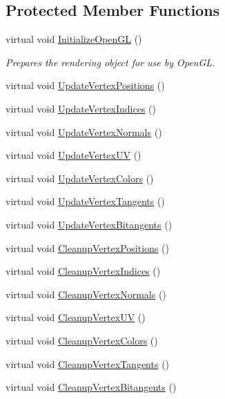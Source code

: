 \subsection*{Protected Member Functions}
\begin{DoxyCompactItemize}
\item
virtual void \hyperlink{class_rendering_object_a77c78d1b42ea2ebfdbf994b6b91ce805}{Initialize\+Open\+GL} ()
\begin{DoxyCompactList}\small\item\em Prepares the rendering object for use by Open\+GL. \end{DoxyCompactList}\item
virtual void \hyperlink{class_rendering_object_a7a097727acf37f9671ddd5e3a9873771}{Update\+Vertex\+Positions} ()
\item
virtual void \hyperlink{class_rendering_object_afb49054121b1b552bce58625db91b851}{Update\+Vertex\+Indices} ()
\item
virtual void \hyperlink{class_rendering_object_ae4b537e1c9b1c5c50cb7b0db83e6f190}{Update\+Vertex\+Normals} ()
\item
virtual void \hyperlink{class_rendering_object_ac00889f2afaa605b09164649ef68a1b6}{Update\+Vertex\+UV} ()
\item
virtual void \hyperlink{class_rendering_object_aca18dbb9252f27cef09df307dbcf02a9}{Update\+Vertex\+Colors} ()
\item
virtual void \hyperlink{class_rendering_object_a5b480a9b97cadfa07669902764139272}{Update\+Vertex\+Tangents} ()
\item
virtual void \hyperlink{class_rendering_object_a594a50e9475057aaf21a0b05b33a5b16}{Update\+Vertex\+Bitangents} ()
\item
virtual void \hyperlink{class_rendering_object_af9c1a07398071cdd0cca3ad36095fc85}{Cleanup\+Vertex\+Positions} ()
\item
virtual void \hyperlink{class_rendering_object_ac60c8a7f3d5678fd4aa8198f6c980e6e}{Cleanup\+Vertex\+Indices} ()
\item
virtual void \hyperlink{class_rendering_object_ad89bc24893f8fe32794f0686c2bb0da1}{Cleanup\+Vertex\+Normals} ()
\item
virtual void \hyperlink{class_rendering_object_a776f54b41f9e9f0e55fc1104919c3e7c}{Cleanup\+Vertex\+UV} ()
\item
virtual void \hyperlink{class_rendering_object_adce4a6d6406eb589b088bedd19127f32}{Cleanup\+Vertex\+Colors} ()
\item
virtual void \hyperlink{class_rendering_object_a0e6c8c9480f1c04202aa6d38a841f06f}{Cleanup\+Vertex\+Tangents} ()
\item
virtual void \hyperlink{class_rendering_object_ae60c4f13ea817ffcb722d34250664c41}{Cleanup\+Vertex\+Bitangents} ()
\end{DoxyCompactItemize}
